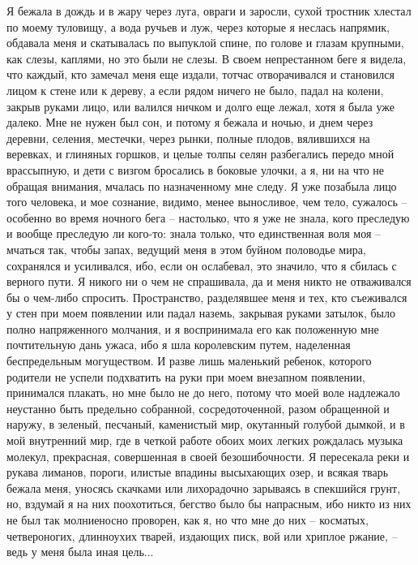 Я бежала в дождь и в жару через луга, овраги и заросли, сухой  тростник
хлестал  по  моему  туловищу,  а  вода ручьев и луж, через которые я неслась
напрямик, обдавала меня и скатывалась по выпуклой спине, по голове и  глазам
крупными,  как  слезы,  каплями,  но это были не слезы. В своем непрестанном
беге я видела, что каждый, кто замечал меня еще издали, тотчас отворачивался
и становился лицом к стене или к дереву, а если рядом ничего не было,  падал
на  колени, закрыв руками лицо, или валился ничком и долго еще лежал, хотя я
была уже далеко. Мне не нужен был сон, и потому я бежала  и  ночью,  и  днем
через  деревни, селения, местечки, через рынки, полные плодов, вялившихся на
веревках, и глиняных горшков, и целые толпы селян  разбегались  передо  мной
врассыпную,  и  дети  с визгом бросались в боковые улочки, а я, ни на что не
обращая внимания, мчалась по назначенному мне следу.  Я  уже  позабыла  лицо
того  человека, и мое сознание, видимо, менее выносливое, чем тело, сужалось
-- особенно во время ночного бега -- настолько, что я  уже  не  знала,  кого
преследую и вообще преследую ли кого-то: знала только, что единственная воля
моя  -- мчаться так, чтобы запах, ведущий меня в этом буйном половодье мира,
сохранялся и усиливался, ибо, если он ослабевал, это значило, что я  сбилась
с  верного  пути.  Я  никого  ни  о  чем  не  спрашивала, да и меня никто не
отваживался бы о чем-либо спросить. Пространство, разделявшее  меня  и  тех,
кто  съеживался  у стен при моем появлении или падал наземь, закрывая руками
затылок,  было  полно  напряженного  молчания,  и  я  воспринимала  его  как
положенную  мне  почтительную  дань  ужаса,  ибо  я  шла  королевским путем,
наделенная  беспредельным  могуществом.  И  разве  лишь  маленький  ребенок,
которого родители не успели подхватить на руки при моем внезапном появлении,
принимался  плакать,  но мне было не до него, потому что моей воле надлежало
неустанно быть предельно  собранной,  сосредоточенной,  разом  обращенной  и
наружу,  в  зеленый, песчаный, каменистый мир, окутанный голубой дымкой, и в
мой внутренний мир, где в четкой работе обоих моих легких  рождалась  музыка
молекул, прекрасная, совершенная в своей безошибочности. Я пересекала реки и
рукава  лиманов,  пороги,  илистые  впадины  высыхающих озер, и всякая тварь
бежала меня, уносясь скачками или лихорадочно зарываясь в  спекшийся  грунт,
но,  вздумай  я  на них поохотиться, бегство было бы напрасным, ибо никто из
них не был так молниеносно проворен, как я, но что мне до них  --  косматых,
четвероногих,  длинноухих  тварей, издающих писк, вой или хриплое ржание, --
ведь у меня была иная цель...

